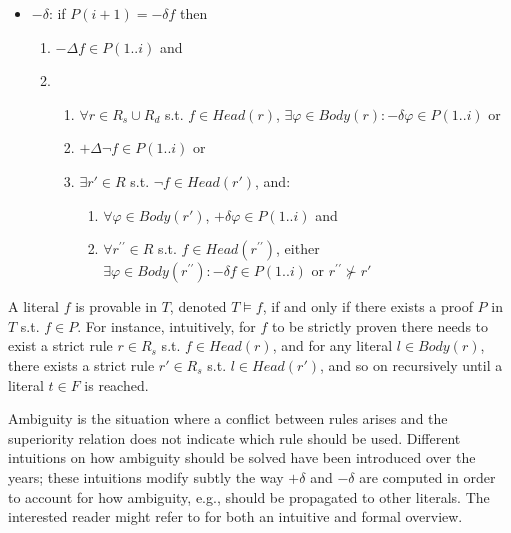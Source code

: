 \documentclass[version=3.21, pagesize, twoside=off, bibliography=totoc, DIV=calc, fontsize=12pt, a4paper, french, english]{scrartcl}
\begin{document}
\begin{itemize}
\item $-\delta$: if $P(i+1) = -\delta f$ then
  \begin{enumerate}
  \item $-\Delta f \in P(1..i)$ and
  \item \vspace{-0.1cm}
    \begin{enumerate}
    \item $\forall r \in R_s \cup R_d$ s.t. $f \in Head(r)$, $\exists \varphi \in Body(r): -\delta \varphi \in P(1..i)$ or
    \item $+\Delta \lnot f \in P(1..i)$ or
    \item $\exists r' \in R$ s.t. $\lnot f \in Head(r')$, and:
      \begin{enumerate}
      \item $\forall \varphi \in Body(r')$, $+\delta \varphi \in P(1..i)$ and
      \item $\forall r^{\prime\prime} \in R$ s.t. $f \in Head(r^{\prime\prime})$, either $\exists \varphi \in Body(r^{\prime\prime}): -\delta f \in P(1..i)$ or $r^{\prime\prime} \not\succ r'$
      \end{enumerate}
    \end{enumerate}
  \end{enumerate}
\end{itemize}

A literal $f$ is provable in $T$, denoted $T \models f$, if and only if there exists a proof $P$ in $T$ s.t. $f \in P$. For instance, intuitively, for $f$ to be strictly proven there needs to exist a strict rule $r \in R_s$ s.t. $f \in Head(r)$, and for any literal $l \in Body(r)$, there exists a strict rule $r' \in R_s$ s.t. $l \in Head(r')$, and so on recursively until a literal $t \in F$ is reached.

Ambiguity is the situation where a conflict between rules arises and the superiority relation does not indicate which rule should be used. 
Different intuitions on how ambiguity should be solved have been introduced over the years; these intuitions modify subtly the way $+\delta$ and $-\delta$ are computed in order to account for how ambiguity, e.g., should be propagated to other literals. The interested reader might refer to \cite{Hecham2018} for both an intuitive and formal overview.
\end{document}
